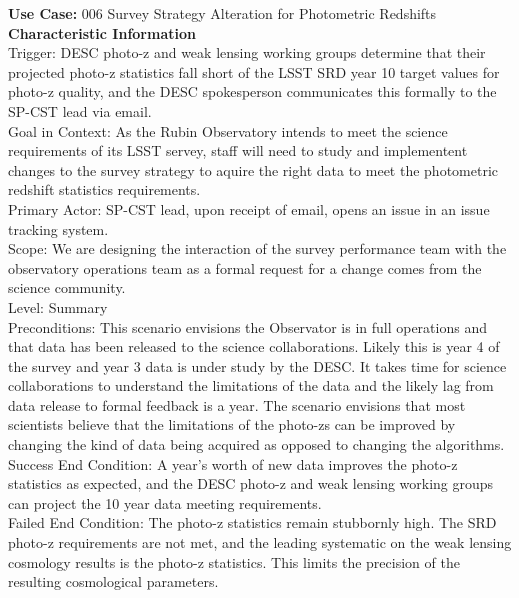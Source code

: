 {\bf Use Case:} 006 Survey Strategy Alteration for Photometric Redshifts \\

{\bf Characteristic Information} \\
Trigger: DESC photo-z and weak lensing working groups determine that their projected photo-z statistics fall short of the LSST SRD year 10 target values for photo-z quality, and the DESC spokesperson communicates this formally to the SP-CST lead via email. \\
Goal in Context: As the Rubin Observatory intends to meet the science requirements of its LSST servey, staff will need to study and implementent changes to the survey strategy to aquire the right data to meet the photometric redshift statistics requirements. \\
Primary Actor: SP-CST lead, upon receipt of email, opens an issue in an issue tracking system. \\
Scope: We are designing the interaction of the survey performance team with the observatory operations team as a formal request for a change comes from the science community. \\
Level: Summary \\
Preconditions: This scenario envisions the Observator is in full operations and that data has been released to the science collaborations.  Likely this is year 4 of the survey and year 3 data is under study by the DESC.  It takes time for science collaborations to understand the limitations of the data and the likely lag from data release to formal feedback is a year. The scenario envisions that most scientists believe that the limitations of the photo-zs can be improved by changing the kind of data being acquired as opposed to changing the algorithms. \\
Success End Condition: A year's worth of new data improves the photo-z statistics as expected, and the DESC photo-z and weak lensing working groups can project the 10 year data meeting requirements. \\
Failed End Condition: The photo-z statistics remain stubbornly high.  The SRD photo-z requirements are not met, and the leading systematic on the weak lensing cosmology results is the photo-z statistics.  This limits the precision of the resulting cosmological parameters. \\

